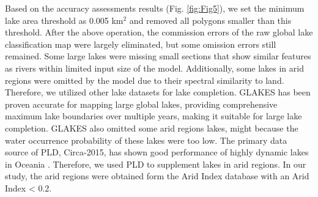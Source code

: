 \documentclass[preprint,12pt,authoryear]{elsarticle}
\begin{document}
Based on the accuracy assessments results (Fig. \ref{fig:Fig5}), we set the minimum lake area threshold as 0.005 km$^2$ and removed all polygons smaller than this threshold. After the above operation, the commission errors of the raw global lake classification map were largely eliminated, but some omission errors still remained. Some large lakes were missing small sections that show similar features as rivers within limited input size of the model. Additionally, some lakes in arid regions were omitted by the model due to their spectral similarity to land. Therefore, we utilized other lake datasets for lake completion. GLAKES has been proven accurate for mapping large global lakes, providing comprehensive maximum lake boundaries over multiple years, making it suitable for large lake completion. GLAKES also omitted some arid regions lakes, might because the water occurrence probability of these lakes were too low. The primary data source of PLD, Circa-2015, has shown good performance of highly dynamic lakes in Oceania \citep{sheng_representative_2016}. Therefore, we used PLD to supplement lakes in arid regions. In our study, the arid regions were obtained form the Arid Index database \citep{zomer_version_2022} with an Arid Index < 0.2.
\end{document}

